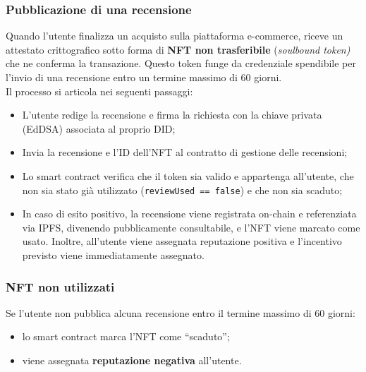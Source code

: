             \subsubsection{Pubblicazione di una recensione}
                \noindent Quando l'utente finalizza un acquisto sulla piattaforma e-commerce, riceve un attestato crittografico sotto forma di \textbf{NFT non trasferibile} (\textit{soulbound token)} che ne conferma la transazione. Questo token funge da credenziale spendibile per l'invio di una recensione entro un termine massimo di 60 giorni. \\
                Il processo si articola nei seguenti passaggi:
                    \begin{itemize}
                        \item L'utente redige la recensione e firma la richiesta con la chiave privata (EdDSA) associata al proprio DID;
                        
                        \item Invia la recensione e l'ID dell'NFT al contratto di gestione delle recensioni;
                        
                        \item Lo smart contract verifica che il token sia valido e appartenga all'utente, che non sia stato già utilizzato (\texttt{reviewUsed == false}) e che non sia scaduto;
                        
                        \item In caso di esito positivo, la recensione viene registrata on-chain e referenziata via IPFS, divenendo pubblicamente consultabile, e l'NFT viene marcato come usato. Inoltre, all'utente viene assegnata reputazione positiva e l'incentivo previsto viene immediatamente assegnato.
                    \end{itemize}

            \subsubsection{NFT non utilizzati}
                \noindent Se l'utente non pubblica alcuna recensione entro il termine massimo di 60 giorni:
                    \begin{itemize}
                        \item lo smart contract marca l’NFT come “scaduto”;
                        
                        \item viene assegnata \textbf{reputazione negativa} all'utente.
                    \end{itemize}
                    
